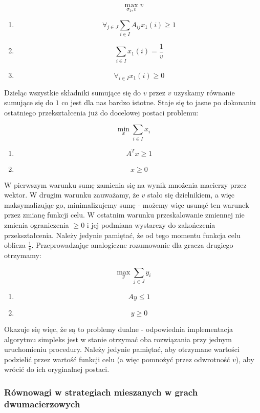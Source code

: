 \documentclass[polish]{standalone}
\begin{document}
$$\max_{\sigma_1,v} v$$
\begin{enumerate}
\item $$\forall_{j \in J} \sum_{i \in I} A_{ij} x_1(i) \geq 1$$
\item $$\sum_{i \in I} x_1(i) = \frac{1}{v}$$
\item $$\forall_{i \in I} x_1(i) \geq 0$$
\end{enumerate}

Dzieląc wszystkie składniki sumujące się do $v$ przez $v$ uzyskamy równanie sumujące się do $1$ co jest dla nas bardzo
istotne. Staje się to jasne po dokonaniu ostatniego przekształcenia już do docelowej postaci problemu:

$$\min_x \sum_{i \in I} x_i$$
\begin{enumerate}
\item $$A^Tx \geq 1$$
\item $$x \geq 0$$
\end{enumerate}

W pierwszym warunku sumę zamienia się na wynik mnożenia macierzy przez wektor. W drugim warunku zauważamy, że $v$ stało
się dzielnikiem, a więc maksymalizując go, minimalizujemy sumę - możemy więc usunąć ten warunek przez zmianę funkcji
celu. W ostatnim warunku przeskalowanie zmiennej nie zmienia ograniczenia $\geq 0$ i jej podmiana wystarczy do
zakończenia przekształcenia. Należy jedynie pamiętać, że od tego momentu funkcja celu oblicza $\frac{1}{v}$.
Przeprowadzając analogiczne rozumowanie dla gracza drugiego otrzymamy:

$$\max_y \sum_{j \in J} y_i$$
\begin{enumerate}
\item $$Ay \leq 1$$
\item $$y \geq 0$$
\end{enumerate}

Okazuje się więc, że są to problemy dualne - odpowiednia implementacja algorytmu simpleks jest w stanie otrzymać oba
rozwiązania przy jednym uruchomieniu procedury. Należy jedynie pamiętać, aby otrzymane wartości podzielić przez wartość
funkcji celu (a więc pomnożyć przez odwrotność $v$), aby wrócić do ich oryginalnej postaci.

\subsubsection{Równowagi w strategiach mieszanych w grach dwumacierzowych}
\end{document}
